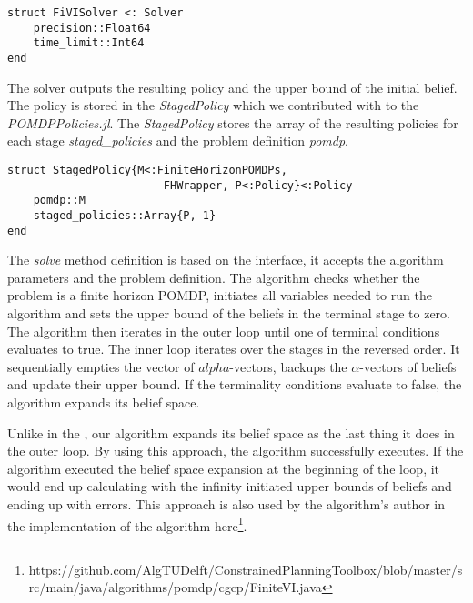 \begin{samepage}
\begin{verbatim}
struct FiVISolver <: Solver
    precision::Float64
    time_limit::Int64
end
\end{verbatim}
\end{samepage}



The solver outputs the resulting policy and the upper bound of the initial belief. The policy is stored in the \textit{StagedPolicy} which we contributed with to the \textit{POMDPPolicies.jl}. The \textit{StagedPolicy} stores the array of the resulting policies for each stage \textit{staged\_policies} and the problem definition \textit{pomdp}. 


\begin{samepage}
\begin{verbatim}
struct StagedPolicy{M<:FiniteHorizonPOMDPs,
                        FHWrapper, P<:Policy}<:Policy
    pomdp::M
    staged_policies::Array{P, 1}
end
\end{verbatim}
\end{samepage}



The \textit{solve} method definition is based on the interface, it accepts the algorithm parameters and the problem definition. The algorithm checks whether the problem is a finite horizon POMDP, initiates all variables needed to run the algorithm and sets the upper bound of the beliefs in the terminal stage to zero. The algorithm then iterates in the outer loop until one of terminal conditions evaluates to true. The inner loop iterates over the stages in the reversed order. It sequentially empties the vector of $alpha$-vectors, backups the $\alpha$-vectors of beliefs and update their upper bound. If the terminality conditions evaluate to false, the algorithm expands its belief space.

Unlike in the \cite{Walraven19}, our algorithm expands its belief space as the last thing it does in the outer loop. By using this approach, the algorithm successfully executes. If the algorithm executed the belief space expansion at the beginning of the loop, it would end up calculating with the infinity initiated upper bounds of beliefs and ending up with errors. This approach is also used by the algorithm's author in the implementation of the algorithm here\footnote{https://github.com/AlgTUDelft/ConstrainedPlanningToolbox/blob/master/src/main/java/algorithms/pomdp/cgcp/FiniteVI.java}.



